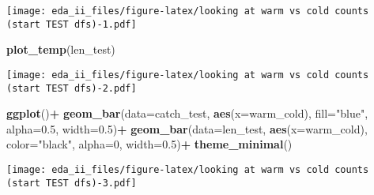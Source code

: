 \documentclass[
]{article}
\newenvironment{Shaded}{\begin{snugshade}}{\end{snugshade}}
\newcommand{\DataTypeTok}[1]{\textcolor[rgb]{0.13,0.29,0.53}{#1}}
\newcommand{\DecValTok}[1]{\textcolor[rgb]{0.00,0.00,0.81}{#1}}
\newcommand{\FloatTok}[1]{\textcolor[rgb]{0.00,0.00,0.81}{#1}}
\newcommand{\KeywordTok}[1]{\textcolor[rgb]{0.13,0.29,0.53}{\textbf{#1}}}
\newcommand{\NormalTok}[1]{#1}
\newcommand{\OperatorTok}[1]{\textcolor[rgb]{0.81,0.36,0.00}{\textbf{#1}}}
\newcommand{\StringTok}[1]{\textcolor[rgb]{0.31,0.60,0.02}{#1}}
\begin{document}
\texttt{[image: eda\_ii\_files/figure-latex/looking at warm vs cold counts (start TEST dfs)-1.pdf]}

\begin{Shaded}
\begin{Highlighting}[]
\KeywordTok{plot_temp}\NormalTok{(len_test)}
\end{Highlighting}
\end{Shaded}

\texttt{[image: eda\_ii\_files/figure-latex/looking at warm vs cold counts (start TEST dfs)-2.pdf]}

\begin{Shaded}
\begin{Highlighting}[]
\KeywordTok{ggplot}\NormalTok{()}\OperatorTok{+}
\StringTok{  }\KeywordTok{geom_bar}\NormalTok{(}\DataTypeTok{data=}\NormalTok{catch_test, }\KeywordTok{aes}\NormalTok{(}\DataTypeTok{x=}\NormalTok{warm_cold), }\DataTypeTok{fill=}\StringTok{"blue"}\NormalTok{, }\DataTypeTok{alpha=}\FloatTok{0.5}\NormalTok{, }\DataTypeTok{width=}\FloatTok{0.5}\NormalTok{)}\OperatorTok{+}
\StringTok{  }\KeywordTok{geom_bar}\NormalTok{(}\DataTypeTok{data=}\NormalTok{len_test, }\KeywordTok{aes}\NormalTok{(}\DataTypeTok{x=}\NormalTok{warm_cold), }\DataTypeTok{color=}\StringTok{"black"}\NormalTok{, }\DataTypeTok{alpha=}\DecValTok{0}\NormalTok{, }\DataTypeTok{width=}\FloatTok{0.5}\NormalTok{)}\OperatorTok{+}
\StringTok{  }\KeywordTok{theme_minimal}\NormalTok{()}
\end{Highlighting}
\end{Shaded}

\texttt{[image: eda\_ii\_files/figure-latex/looking at warm vs cold counts (start TEST dfs)-3.pdf]}
\end{document}
